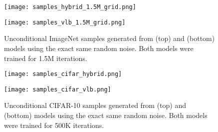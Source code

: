 \documentclass{article}
\begin{document}
\clearpage

\begin{figure}[t]
    \centerline{\texttt{[image: samples\_hybrid\_1.5M\_grid.png]}}
    \vskip 0.1in
    \centerline{\texttt{[image: samples\_vlb\_1.5M\_grid.png]}}
    \caption{\label{fig:uncondvlbcomparison} Unconditional ImageNet  samples generated from  (top) and  (bottom) models using the exact same random noise. Both models were trained for 1.5M iterations.}
\end{figure}

\begin{figure}[t]
    \centering
    \centerline{\texttt{[image: samples\_cifar\_hybrid.png]}}
    \vskip 0.1in
    \centerline{\texttt{[image: samples\_cifar\_vlb.png]}}
    \caption{\label{fig:uncondvlbcomparison_cifar} Unconditional CIFAR-10 samples generated from  (top) and  (bottom) models using the exact same random noise. Both models were trained for 500K iterations.}
\end{figure}
\end{document}
